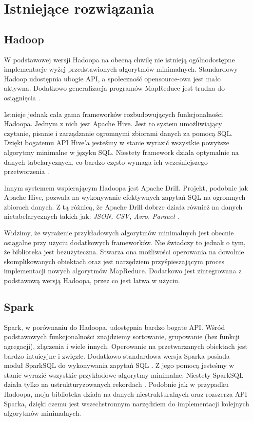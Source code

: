 \documentclass[licencjacka]{pracamgr}
\begin{document}
\chapter{Istniejące rozwiązania}

\section{Hadoop}

W podstawowej wersji Hadoopa na obecną chwilę nie istnieją ogólnodostępne implementacje wyżej przedstawionych algorytmów minimalnych. Standardowy Hadoop udostępnia ubogie API, a społeczność opensource-owa jest mało aktywna.   Dodatkowo generalizacja programów MapReduce jest trudna do osiągnięcia \cite{shvachko2010hadoop, white2012hadoop, taylor2010overview}.

Istnieje jednak cała gama frameworków rozbudowujących funkcjonalności Hadoopa. Jednym z nich jest Apache Hive. Jest to system umożliwiający czytanie, pisanie i zarządzanie ogromnymi zbiorami danych za pomocą SQL. Dzięki bogatemu API Hive'a jesteśmy w stanie wyrazić wszystkie powyższe algorytmy minimalne w języku SQL. Niestety framework działa optymalnie na danych tabelarycznych, co bardzo często wymaga ich wcześniejszego przetworzenia \cite{Huai:2014:MTA:2588555.2595630} .

Innym systemem wspierającym Hadoopa jest Apache Drill. Projekt, podobnie jak Apache Hive, pozwala na wykonywanie efektywnych zapytań SQL na ogromnych zbiorach danych. Z tą różnicą, że Apache Drill dobrze działa również na danych nietabelarycznych takich jak: \textit{JSON, CSV, Avro, Parquet} \cite{apache_drill}.

Widzimy, że wyrażenie przykładowych algorytmów minimalnych jest obecnie osiągalne przy użyciu dodatkowych frameworków. Nie świadczy to jednak o tym, że biblioteka jest bezużyteczna. Stwarza ona możliwości operowania na dowolnie skomplikowanych obiektach oraz jest narzędziem przyśpieszającym proces implementacji nowych algorytmów MapReduce. Dodatkowo jest zintegrowana z podstawową wersją Hadoopa, przez co jest łatwa w użyciu.

\section{Spark}

Spark, w porównaniu do Hadoopa, udostępnia bardzo bogate API. Wśród podstawowych funkcjonalności znajdziemy sortowanie, grupowanie (bez funkcji agregacji), złączenia i wiele innych. Operowanie na przetwarzanych obiektach jest bardzo intuicyjne i zwięzłe. Dodatkowo standardowa wersja Sparka posiada moduł SparkSQL do wykonywania zapytań SQL \cite{zaharia2010spark}. Z jego pomocą jesteśmy w stanie wyrazić wszystkie przykładowe algorytmy minimalne. Niestety SparkSQL działa tylko na ustrukturyzowanych rekordach \cite{Armbrust:2015:SSR:2723372.2742797}. Podobnie jak w przypadku Hadoopa, moja biblioteka działa na danych niestrukturalnych oraz rozszerza API Sparka, dzięki czemu jest wszechstronnym narzędziem do implementacji kolejnych algorytmów minimalnych.
\end{document}
